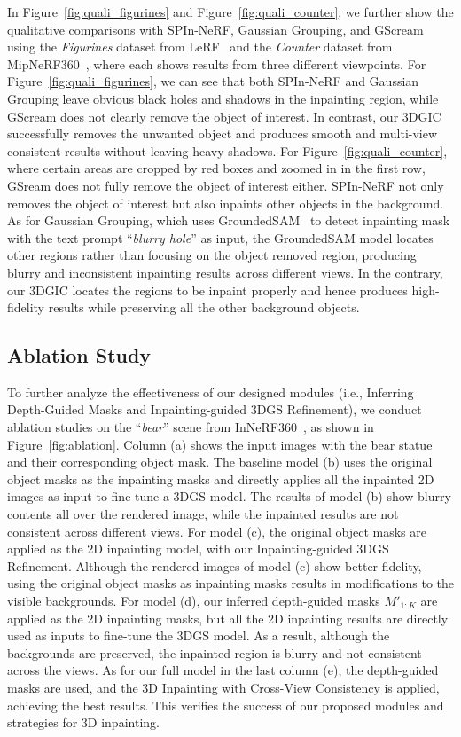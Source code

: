 In Figure~\ref{fig:quali_figurines} and Figure~\ref{fig:quali_counter}, we further show the qualitative comparisons with SPIn-NeRF, Gaussian Grouping, and GScream using the \textit{Figurines} dataset from LeRF~\cite{kerr2023lerf} and the \textit{Counter} dataset from MipNeRF360~\cite{barron2022mipnerf360}, where each shows results from three different viewpoints. For Figure~\ref{fig:quali_figurines}, we can see that both SPIn-NeRF and Gaussian Grouping leave obvious black holes and shadows in the inpainting region, while GScream does not clearly remove the object of interest. In contrast, our 3DGIC successfully removes the unwanted object and produces smooth and multi-view consistent results without leaving heavy shadows. For Figure~\ref{fig:quali_counter}, where certain areas are cropped by red boxes and zoomed in in the first row, GSream does not fully remove the object of interest either. SPIn-NeRF not only removes the object of interest but also inpaints other objects in the background. As for Gaussian Grouping, which uses GroundedSAM~\cite{ren2024grounded} to detect inpainting mask with the text prompt ``\textit{blurry hole}'' as input, the GroundedSAM model locates other regions rather than focusing on the object removed region, producing blurry and inconsistent inpainting results across different views. In the contrary, our 3DGIC locates the regions to be inpaint properly and hence produces high-fidelity results while preserving all the other background objects.

\subsection{Ablation Study}
\label{sec:ablation}
To further analyze the effectiveness of our designed modules (i.e., Inferring Depth-Guided Masks and Inpainting-guided 3DGS Refinement), we conduct ablation studies on the ``\textit{bear}'' scene from InNeRF360~\cite{wang2024innerf360}, as shown in Figure~\ref{fig:ablation}. Column (a) shows the input images with the bear statue and their corresponding object mask. The baseline model (b) uses the original object masks as the inpainting masks and directly applies all the inpainted 2D images as input to fine-tune a 3DGS model. The results of model (b) show blurry contents all over the rendered image, while the inpainted results are not consistent across different views.  For model (c), the original object masks are applied as the 2D inpainting model, with our Inpainting-guided 3DGS Refinement. Although the rendered images of model (c) show better fidelity, using the original object masks as inpainting masks results in modifications to the visible backgrounds. For model (d), our inferred depth-guided masks $M'_{1:K}$ are applied as the 2D inpainting masks, but all the 2D inpainting results are directly used as inputs to fine-tune the 3DGS model. As a result, although the backgrounds are preserved, the inpainted region is blurry and not consistent across the views. As for our full model in the last column (e), the depth-guided masks are used, and the 3D Inpainting with Cross-View Consistency is applied, achieving the best results. This verifies the success of our proposed modules and strategies for 3D inpainting.

